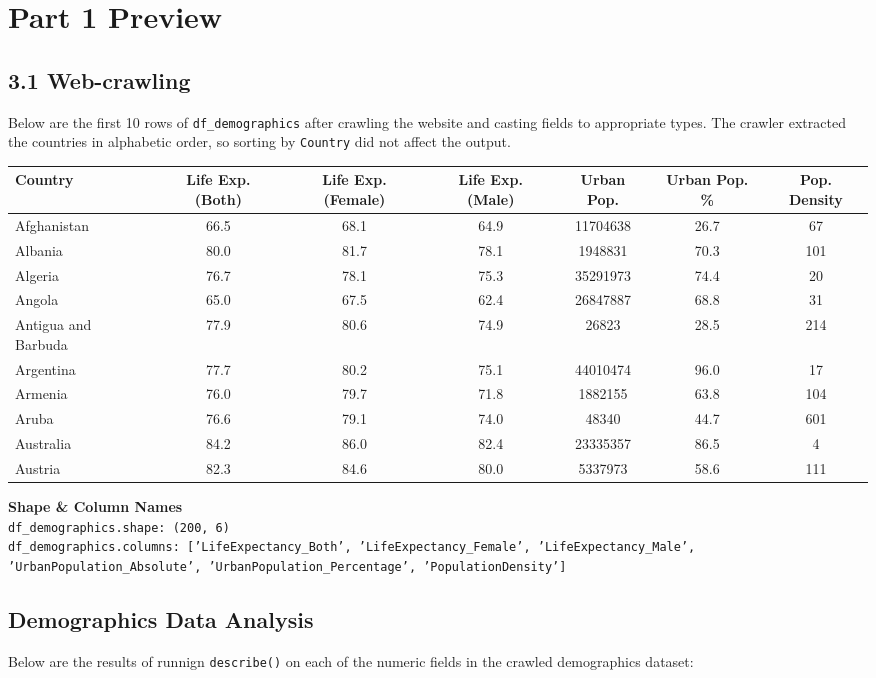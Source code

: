 \documentclass[14pt]{extarticle}
\begin{document}
\section*{Part 1 Preview}
\subsection*{3.1 Web-crawling}
Below are the first 10 rows of \texttt{df\_demographics} after crawling the website
and casting fields to appropriate types. The crawler extracted the countries in alphabetic order,
so sorting by \texttt{Country} did not affect the output.

{\scriptsize
\begin{center}
\begin{tabular}{ |l|c|c|c|c|c|c| }
  \hline
  Country&Life Exp. (Both)&Life Exp. (Female)&Life Exp. (Male)&Urban Pop.&Urban Pop. \%&Pop. Density\\
  \hline
  Afghanistan&66.5&68.1&64.9&11704638&26.7&67\\
  Albania&80.0&81.7&78.1&1948831&70.3&101\\
  Algeria&76.7&78.1&75.3&35291973&74.4&20\\
  Angola&65.0&67.5&62.4&26847887&68.8&31\\
  Antigua and Barbuda&77.9&80.6&74.9&26823&28.5&214\\
  Argentina&77.7&80.2&75.1&44010474&96.0&17\\
  Armenia&76.0&79.7&71.8&1882155&63.8&104\\
  Aruba&76.6&79.1&74.0&48340&44.7&601\\
  Australia&84.2&86.0&82.4&23335357&86.5&4\\
  Austria&82.3&84.6&80.0&5337973&58.6&111\\
  \hline
\end{tabular}
\end{center}}

\textbf{Shape \& Column Names}\\
{\footnotesize\texttt{df\_demographics.shape: (200, 6)\\
df\_demographics.columns: ['LifeExpectancy\_Both', 'LifeExpectancy\_Female', 'LifeExpectancy\_Male', 'UrbanPopulation\_Absolute', 'UrbanPopulation\_Percentage', 'PopulationDensity']}}

\subsection*{Demographics Data Analysis}
Below are the results of runnign \texttt{describe()} on each of the numeric fields in the crawled
demographics dataset:
\end{document}
